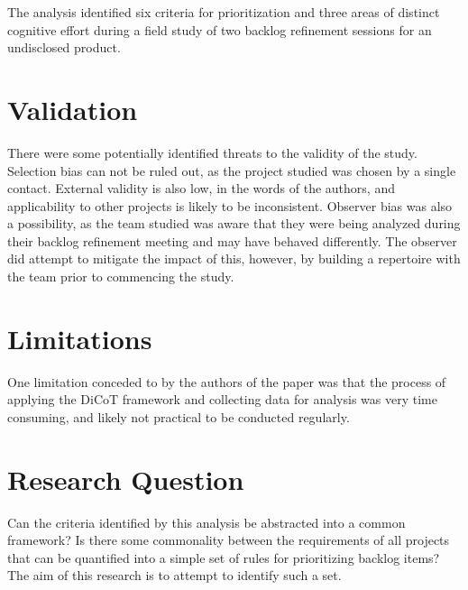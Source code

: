 \documentclass{article}
\begin{document}
The analysis identified six criteria for prioritization and three areas of distinct cognitive effort during a field study of two backlog refinement sessions for an undisclosed product.

\section{Validation}
There were some potentially identified threats to the validity of the study. Selection bias can not be ruled out, as the project studied was chosen by a single contact. External validity is also low, in the words of the authors, and applicability to other projects is likely to be inconsistent. Observer bias was also a possibility, as the team studied was aware that they were being analyzed during their backlog refinement meeting and may have behaved differently. The observer did attempt to mitigate the impact of this, however, by building a repertoire with the team prior to commencing the study.

\section{Limitations}
One limitation conceded to by the authors of the paper was that the process of applying the DiCoT framework and collecting data for analysis was very time consuming, and likely not practical to be conducted regularly.

\section{Research Question}
Can the criteria identified by this analysis be abstracted into a common framework? Is there some commonality between the requirements of all projects that can be quantified into a simple set of rules for prioritizing backlog items? The aim of this research is to attempt to identify such a set.



\end{document}
